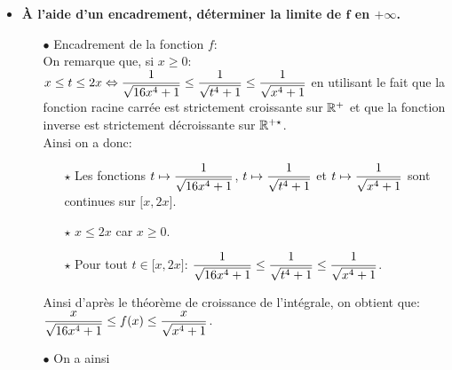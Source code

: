 \documentclass[a4paper, 11pt,reqno]{article}
\begin{document}
\begin{correction}
\begin{enumerate}
\begin{itemize}
\begin{itemize}
\begin{center}
				                  \end{center}
			            \end{itemize}
			      \item  \textbf{ \`{A} l'aide d'un encadrement, d\'eterminer la limite de $\mathbf{f}$ en $\mathbf{+\infty}$.}
			            \begin{itemize}
				            \item[$\bullet$] Encadrement de la fonction $f$:\\
				                  \noindent On remarque que, si $x\geq 0$: $x\leq t\leq 2x \Leftrightarrow \displaystyle\frac{1}{\sqrt{16x^4+1}}\leq \displaystyle\frac{1}{\sqrt{t^4+1}}\leq \displaystyle\frac{1}{\sqrt{x^4+1}}$ en utilisant le fait que la fonction racine carr\'ee est strictement croissante sur $\mathbb{R}^+$ et que la fonction inverse est strictement d\'ecroissante sur $\mathbb{R}^{+\star}$. \\
				                  \noindent Ainsi on a donc:
				                  \begin{itemize}
					                  \item[$\star$] Les fonctions $t\mapsto \displaystyle\frac{1}{\sqrt{16x^4+1}}$, $t\mapsto \displaystyle\frac{1}{\sqrt{t^4+1}}$ et $t\mapsto \displaystyle\frac{1}{\sqrt{x^4+1}}$ sont continues sur $\lbrack x,2x\rbrack$.
					                  \item[$\star$] $x\leq 2x$ car $x\geq 0$.
					                  \item[$\star$] Pour tout $t\in\lbrack x,2x\rbrack$: $\displaystyle\frac{1}{\sqrt{16x^4+1}}\leq \displaystyle\frac{1}{\sqrt{t^4+1}}\leq \displaystyle\frac{1}{\sqrt{x^4+1}}$.
				                  \end{itemize}
				                  Ainsi d'apr\`{e}s le th\'eor\`{e}me de croissance de l'int\'egrale, on obtient que: $\displaystyle\frac{x}{\sqrt{16x^4+1}}\leq f(x)\leq \displaystyle\frac{x}{\sqrt{x^4+1}}$.
				            \item[$\bullet$] On a ainsi

\end{itemize}
\end{itemize}
\end{enumerate}
\end{correction}
\end{document}
